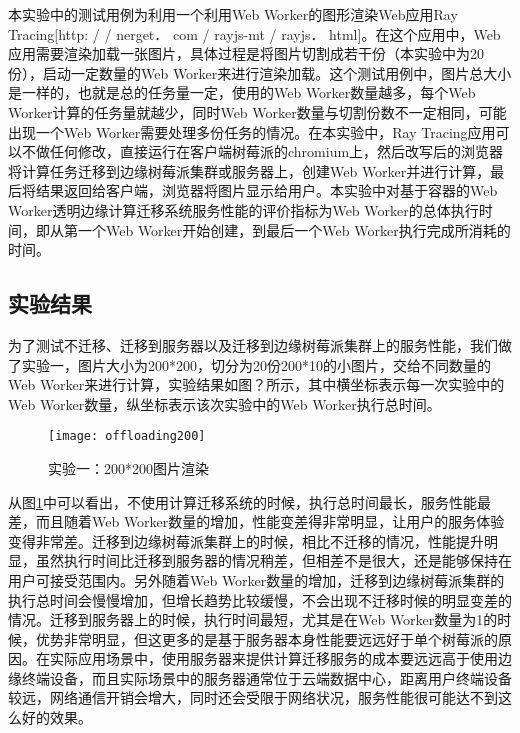 本实验中的测试用例为利用一个利用Web Worker的图形渲染Web应用Ray Tracing[http: / / nerget． com / rayjs-mt / rayjs． html]。在这个应用中，Web应用需要渲染加载一张图片，具体过程是将图片切割成若干份（本实验中为20份），启动一定数量的Web Worker来进行渲染加载。这个测试用例中，图片总大小是一样的，也就是总的任务量一定，使用的Web Worker数量越多，每个Web Worker计算的任务量就越少，同时Web Worker数量与切割份数不一定相同，可能出现一个Web Worker需要处理多份任务的情况。在本实验中，Ray Tracing应用可以不做任何修改，直接运行在客户端树莓派的chromium上，然后改写后的浏览器将计算任务迁移到边缘树莓派集群或服务器上，创建Web Worker并进行计算，最后将结果返回给客户端，浏览器将图片显示给用户。本实验中对基于容器的Web Worker透明边缘计算迁移系统服务性能的评价指标为Web Worker的总体执行时间，即从第一个Web Worker开始创建，到最后一个Web Worker执行完成所消耗的时间。

\subsection{实验结果}

为了测试不迁移、迁移到服务器以及迁移到边缘树莓派集群上的服务性能，我们做了实验一，图片大小为200*200，切分为20份200*10的小图片，交给不同数量的Web Worker来进行计算，实验结果如图？所示，其中横坐标表示每一次实验中的Web Worker数量，纵坐标表示该次实验中的Web Worker执行总时间。

\begin{figure}[!htbp]
    \centering
    \texttt{[image: offloading200]}
    \caption{实验一：200*200图片渲染}
    \label{fig:computation_offloading_result_picture_200}
\end{figure}

从图\ref{fig:computation_offloading_result_picture_200}中可以看出，不使用计算迁移系统的时候，执行总时间最长，服务性能最差，而且随着Web Worker数量的增加，性能变差得非常明显，让用户的服务体验变得非常差。迁移到边缘树莓派集群上的时候，相比不迁移的情况，性能提升明显，虽然执行时间比迁移到服务器的情况稍差，但相差不是很大，还是能够保持在用户可接受范围内。另外随着Web Worker数量的增加，迁移到边缘树莓派集群的执行总时间会慢慢增加，但增长趋势比较缓慢，不会出现不迁移时候的明显变差的情况。迁移到服务器上的时候，执行时间最短，尤其是在Web Worker数量为1的时候，优势非常明显，但这更多的是基于服务器本身性能要远远好于单个树莓派的原因。在实际应用场景中，使用服务器来提供计算迁移服务的成本要远远高于使用边缘终端设备，而且实际场景中的服务器通常位于云端数据中心，距离用户终端设备较远，网络通信开销会增大，同时还会受限于网络状况，服务性能很可能达不到这么好的效果。


